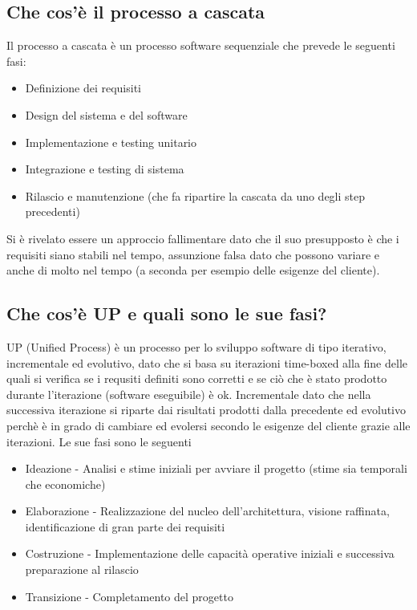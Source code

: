 \documentclass[12pt, a4paper, openany]{book}
\begin{document}
\subsection*{Che cos'è il processo a cascata}
Il processo a cascata è un processo software sequenziale che prevede le seguenti fasi:
\begin{itemize}
    \item Definizione dei requisiti
    \item Design del sistema e del software
    \item Implementazione e testing unitario
    \item Integrazione e testing di sistema
    \item Rilascio e manutenzione (che fa ripartire la cascata da uno degli step precedenti)
\end{itemize}
Si è rivelato essere un approccio fallimentare dato che il suo presupposto è che i requisiti
siano stabili nel tempo, assunzione falsa dato che possono variare e anche di molto nel tempo (a
seconda per esempio delle esigenze del cliente).

\subsection*{Che cos'è UP e quali sono le sue fasi?}
UP (Unified Process) è un processo per lo sviluppo software di tipo iterativo, incrementale
ed evolutivo, dato che si basa su iterazioni time-boxed alla fine delle quali si verifica se i requsiti definiti sono corretti
e se ciò che è stato prodotto durante l'iterazione (software eseguibile) è ok. Incrementale dato che
nella successiva iterazione si riparte dai risultati prodotti dalla precedente ed evolutivo perchè è in grado
di cambiare ed evolersi secondo le esigenze del cliente grazie alle iterazioni. Le sue fasi sono le seguenti
\begin{itemize}
    \item Ideazione - Analisi e stime iniziali per avviare il progetto (stime sia temporali che economiche)
    \item Elaborazione - Realizzazione del nucleo dell'architettura, visione raffinata, identificazione di gran parte
    dei requisiti
    \item Costruzione - Implementazione delle capacità operative iniziali e successiva preparazione al rilascio
    \item Transizione - Completamento del progetto
\end{itemize}
\end{document}
